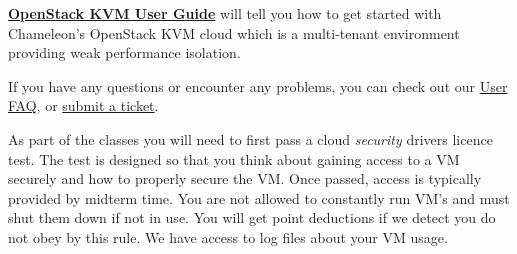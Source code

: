 \textbf{\href{https://www.chameleoncloud.org/docs/user-guides/openstack-kvm-user-guide/}{OpenStack
KVM User Guide}} will tell you how to get started with Chameleon's
OpenStack KVM cloud which is a multi-tenant environment providing weak
performance isolation. 

If you have any questions or encounter any problems, you can check out
our \href{https://www.chameleoncloud.org/docs/user-faq/}{User FAQ},
or \href{https://www.chameleoncloud.org/user/help/}{submit a ticket}.

\begin{IU}
As part of the classes you will need to first pass a cloud {\em security}
drivers licence test.  The test is designed so that you think about
gaining access to a VM securely and how to properly secure the
VM. Once passed, access is typically provided by midterm time. You are
not allowed to constantly run VM's and must shut them down if not in
use. You will get point deductions if we detect you do not obey by
this rule. We have access to log files about your VM usage.
\end{IU}

